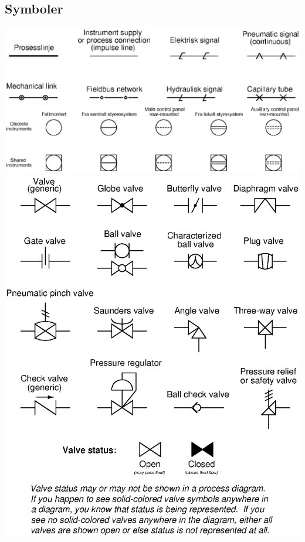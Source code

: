 \documentclass[10pt,a5paper]{article}
\begin{document}
\subsection{Symboler}
\includegraphics[width=1\textwidth]{diagrams00.eps}
\includegraphics[width=1\textwidth]{diagrams01.eps}
\includegraphics[width=1\textwidth]{diagrams02.eps}
\end{document}
